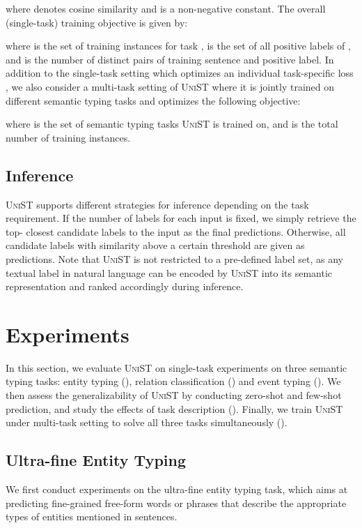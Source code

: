 \documentclass[11pt]{article}
\newcommand{\model}{\textsc{UniST}\xspace}
\begin{document}
where  denotes cosine similarity and  is a non-negative constant. The overall (single-task) training objective is given by:

where  is the set of training instances for task ,  is the set of all positive labels of , and  is the number of distinct pairs of training sentence and positive label. In addition to the single-task setting which optimizes an individual task-specific loss , we also consider a multi-task setting of \model where it is jointly trained on different semantic typing tasks and optimizes the following objective:

where  is the set of semantic typing tasks \model is trained on, and  is the total number of training instances.



\subsection{Inference} \label{infer}
\model supports different strategies for inference depending on the task requirement. If the number of labels for each input is fixed, we simply retrieve the top- closest candidate labels to the input as the final predictions. Otherwise, all candidate labels with similarity above a certain threshold are given as predictions. Note that \model is not restricted to a pre-defined label set, as any textual label in natural language can be encoded by \model into its semantic representation and ranked accordingly during inference. 
\section{Experiments}

In this section, we evaluate \model on single-task experiments on three semantic typing tasks: entity typing (), relation classification () and event typing (). We then assess the generalizability of \model by conducting zero-shot and few-shot prediction, and study the effects of task description (). Finally, we train \model under multi-task setting to solve all three tasks simultaneously ().

\subsection{Ultra-fine Entity Typing} \label{entity}
We first conduct experiments on the ultra-fine entity typing task, which aims at predicting fine-grained free-form words or phrases that describe the appropriate types of entities mentioned in sentences.
\end{document}
